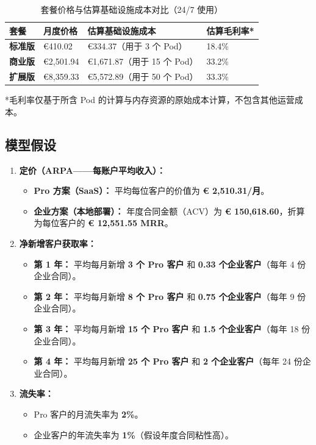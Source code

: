 \documentclass[11pt, a4paper, oneside]{article}
\begin{document}
\begin{table}[H]
\centering
\caption{套餐价格与估算基础设施成本对比（24/7 使用）}
\label{tab:cost_analysis}
\begin{tabularx}{\textwidth}{L X X X} 
\toprule
\textbf{套餐} & \textbf{月度价格} & \textbf{估算基础设施成本} & \textbf{估算毛利率*} \\
\midrule
\textbf{标准版} & \euro{410.02} & \euro{334.37}（用于 3 个 Pod） & 18.4\% \\
\addlinespace
\textbf{商业版} & \euro{2,501.94} & \euro{1,671.87}（用于 15 个 Pod） & 33.2\% \\
\addlinespace
\textbf{扩展版} & \euro{8,359.33} & \euro{5,572.89}（用于 50 个 Pod） & 33.3\% \\
\bottomrule
\end{tabularx}
\raggedright
\footnotesize{*毛利率仅基于所含 Pod 的计算与内存资源的原始成本计算，不包含其他运营成本。}
\end{table}



\subsection{模型假设}
\begin{enumerate}
    \item \textbf{定价（ARPA——每账户平均收入）：}
    \begin{itemize}
        \item \textbf{Pro 方案（SaaS）：} 平均每位客户的价值为 \textbf{\euro{} 2,510.31/月}。
        \item \textbf{企业方案（本地部署）：} 年度合同金额（ACV）为 \textbf{\euro{} 150,618.60}，折算为每位客户的 \textbf{\euro{} 12,551.55 MRR}。
    \end{itemize}

    \item \textbf{净新增客户获取率：}
    \begin{itemize}
        \item \textbf{第 1 年：} 平均每月新增 \textbf{3 个 Pro 客户} 和 \textbf{0.33 个企业客户}（每年 4 份企业合同）。
        \item \textbf{第 2 年：} 平均每月新增 \textbf{8 个 Pro 客户} 和 \textbf{0.75 个企业客户}（每年 9 份企业合同）。
        \item \textbf{第 3 年：} 平均每月新增 \textbf{15 个 Pro 客户} 和 \textbf{1.5 个企业客户}（每年 18 份企业合同）。
        \item \textbf{第 4 年：} 平均每月新增 \textbf{25 个 Pro 客户} 和 \textbf{2 个企业客户}（每年 24 份企业合同）。
    \end{itemize}

    \item \textbf{流失率：}
    \begin{itemize}
        \item Pro 客户的月流失率为 \textbf{2\%}。
        \item 企业客户的年流失率为 \textbf{1\%}（假设年度合同粘性高）。
    \end{itemize}
\end{enumerate}
\end{document}
